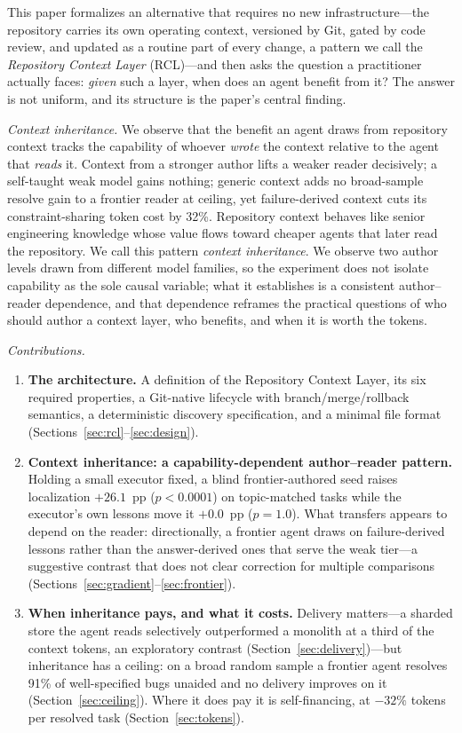 \documentclass[sigconf,screen]{acmart}
\begin{document}
This paper formalizes an alternative that requires no new infrastructure---the
repository carries its own operating context, versioned by Git, gated by code
review, and updated as a routine part of every change, a pattern we call the
\emph{Repository Context Layer} (RCL)---and then asks the question a practitioner
actually faces: \emph{given} such a layer, when does an agent benefit from it? The
answer is not uniform, and its structure is the paper's central finding.

\emph{Context inheritance.} We observe that the benefit an agent draws from
repository context tracks the capability of whoever \emph{wrote} the context
relative to the agent that \emph{reads} it. Context from a stronger author lifts a
weaker reader decisively; a self-taught weak model gains nothing; generic context
adds no broad-sample resolve gain to a frontier reader at ceiling, yet
failure-derived context cuts its constraint-sharing token cost by 32\%. Repository context
behaves like senior engineering knowledge whose value flows toward cheaper agents
that later read the repository. We call this pattern \emph{context inheritance}. We
observe two author levels drawn from different model families, so the experiment
does not isolate capability as the sole causal variable; what it establishes is a
consistent author--reader dependence, and that dependence reframes the practical
questions of who should author a context layer, who benefits, and when it is worth
the tokens.

\emph{Contributions.}
\begin{enumerate}
\item \textbf{The architecture.} A definition of the Repository Context Layer, its
six required properties, a Git-native lifecycle with branch/merge/rollback
semantics, a deterministic discovery specification, and a minimal file format
(Sections~\ref{sec:rcl}--\ref{sec:design}).
\item \textbf{Context inheritance: a capability-dependent author--reader pattern.}
Holding a small executor fixed, a blind frontier-authored seed raises localization
$+26.1$~pp ($p < 0.0001$) on topic-matched tasks while the executor's own lessons
move it $+0.0$~pp ($p = 1.0$). What transfers appears to depend on the reader:
directionally, a frontier agent draws on failure-derived lessons rather than the
answer-derived ones that serve the weak tier---a suggestive contrast that does not
clear correction for multiple comparisons
(Sections~\ref{sec:gradient}--\ref{sec:frontier}).
\item \textbf{When inheritance pays, and what it costs.} Delivery matters---a
sharded store the agent reads selectively outperformed a monolith at a third of
the context tokens, an exploratory contrast (Section~\ref{sec:delivery})---but inheritance has a ceiling: on a
broad random sample a frontier agent resolves 91\% of well-specified bugs unaided
and no delivery improves on it (Section~\ref{sec:ceiling}). Where it does pay it
is self-financing, at $-32\%$ tokens per resolved task (Section~\ref{sec:tokens}).
\end{enumerate}
\end{document}
